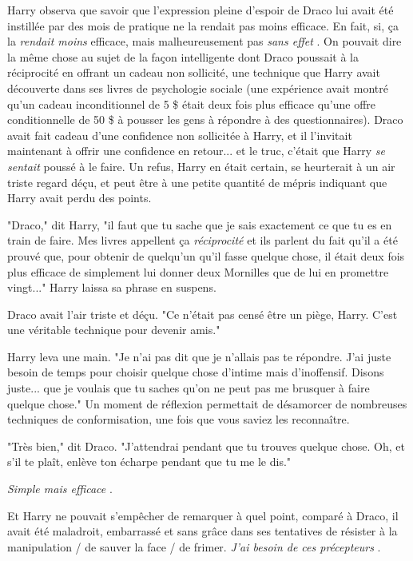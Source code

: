 Harry observa que savoir que l'expression pleine d'espoir de Draco lui avait été instillée par des mois de pratique ne la rendait pas moins efficace. En fait, si, ça la \emph{rendait moins}  efficace, mais malheureusement pas \emph{sans effet} . On pouvait dire la même chose au sujet de la façon intelligente dont Draco poussait à la réciprocité en offrant un cadeau non sollicité, une technique que Harry avait découverte dans ses livres de psychologie sociale (une expérience avait montré qu'un cadeau inconditionnel de 5 \$ était deux fois plus efficace qu'une offre conditionnelle de 50 \$ à pousser les gens à répondre à des questionnaires). Draco avait fait cadeau d'une confidence non sollicitée à Harry, et il l'invitait maintenant à offrir une confidence en retour... et le truc, c'était que Harry \emph{se sentait}  poussé à le faire. Un refus, Harry en était certain, se heurterait à un air triste regard déçu, et peut être à une petite quantité de mépris indiquant que Harry avait perdu des points.

"Draco," dit Harry, "il faut que tu sache que je sais exactement ce que tu es en train de faire. Mes livres appellent ça \emph{réciprocité}  et ils parlent du fait qu'il a été prouvé que, pour obtenir de quelqu'un qu'il fasse quelque chose, il était deux fois plus efficace de simplement lui donner deux Mornilles que de lui en promettre vingt..." Harry laissa sa phrase en suspens.

Draco avait l'air triste et déçu. "Ce n'était pas censé être un piège, Harry. C'est une véritable technique pour devenir amis."

Harry leva une main. "Je n'ai pas dit que je n'allais pas te répondre. J'ai juste besoin de temps pour choisir quelque chose d'intime mais d'inoffensif. Disons juste... que je voulais que tu saches qu'on ne peut pas me brusquer à faire quelque chose." Un moment de réflexion permettait de désamorcer de nombreuses techniques de conformisation, une fois que vous saviez les reconnaître.

"Très bien," dit Draco. "J'attendrai pendant que tu trouves quelque chose. Oh, et s'il te plaît, enlève ton écharpe pendant que tu me le dis."

\emph{Simple mais efficace} .

Et Harry ne pouvait s'empêcher de remarquer à quel point, comparé à Draco, il avait été maladroit, embarrassé et sans grâce dans ses tentatives de résister à la manipulation / de sauver la face / de frimer. \emph{J'ai besoin de ces précepteurs} .

